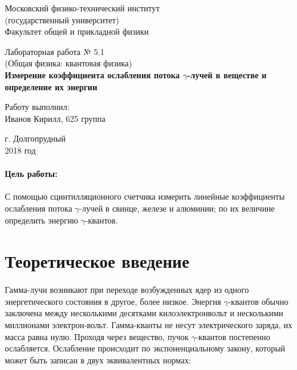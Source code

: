 \documentclass[12pt]{kiarticle} %
\begin{document}
	
	\begin{titlepage}
		\begin{center}
			\large 	Московский физико-технический институт \\
			(государственный университет) \\
			Факультет общей и прикладной физики \\
			\vspace{0.2cm}
			
			\vspace{4.5cm}
			Лабораторная работа № 5.1 \\ \vspace{0.2cm}
			\large (Общая физика: квантовая физика) \\ \vspace{0.2cm}
			\LARGE \textbf{Измерение коэффициента ослабления потока $ \gamma $-лучей в веществе и определение их энергии}
		\end{center}
		\vspace{2.3cm} \large
		
		\begin{center}
			Работу выполнил: \\
			Иванов Кирилл,
			625 группа
			\vspace{10mm}		
			
		\end{center}
		
		\begin{center} \vspace{60mm}
			г. Долгопрудный \\
			2018 год
		\end{center}
	\end{titlepage}

	
	\paragraph*{Цель работы:} С помощью сцинтилляционного счетчика измерить линейные коэффициенты ослабления потока $ \gamma $-лучей в свинце, железе и алюминии; по их величине определить энергию $ \gamma $-квантов.
	
	\section{Теоретическое введение}
	
	Гамма-лучи возникают при переходе возбужденных ядер из одного энергетического состояния в другое, более низкое. Энергия $ \gamma $-квантов обычно заключена между несколькими десятками килоэлектронвольт и несколькими миллионами электрон-вольт. Гамма-кванты не несут электрического заряда, их масса равна нулю. Проходя через вещество, пучок $ \gamma $-квантов постепенно ослабляется. Ослабление происходит по экспоненциальному закону, который может быть записан в двух эквивалентных нормах:
	
\end{document}
